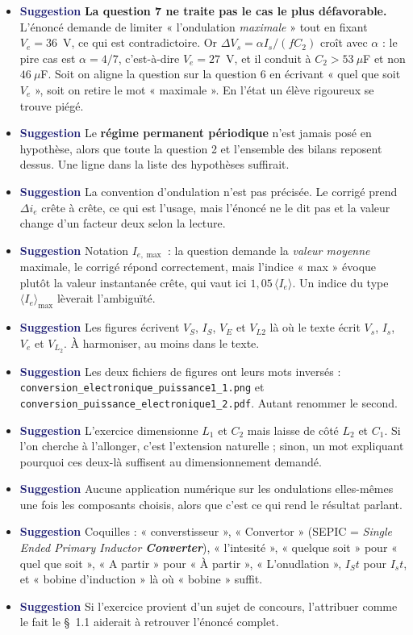 \documentclass[a4paper,11pt]{article}
\newcommand{\suggestion}{\textcolor{MidnightBlue}{\textbf{Suggestion}}}
\begin{document}
\begin{itemize}
	\item \suggestion{} \textbf{La question 7 ne traite pas le cas le plus défavorable.} L'énoncé
	demande de limiter « l'ondulation \textit{maximale} » tout en fixant $V_e=36$~V, ce qui est
	contradictoire. Or $\Delta V_s=\alpha I_s/(fC_2)$ croît avec $\alpha$ : le pire cas est
	$\alpha=4/7$, c'est-à-dire $V_e=27$~V, et il conduit à $C_2>53~\mu$F et non $46~\mu$F. Soit on
	aligne la question sur la question 6 en écrivant « quel que soit $V_e$ », soit on retire le mot
	« maximale ». En l'état un élève rigoureux se trouve piégé.
	\item \suggestion{} Le \textbf{régime permanent périodique} n'est jamais posé en hypothèse, alors
	que toute la question 2 et l'ensemble des bilans reposent dessus. Une ligne dans la liste des
	hypothèses suffirait.
	\item \suggestion{} La convention d'ondulation n'est pas précisée. Le corrigé prend $\Delta i_e$
	crête à crête, ce qui est l'usage, mais l'énoncé ne le dit pas et la valeur change d'un facteur
	deux selon la lecture.
	\item \suggestion{} Notation $I_{e,\max}$ : la question demande la \textit{valeur moyenne} maximale,
	le corrigé répond correctement, mais l'indice « max » évoque plutôt la valeur instantanée crête,
	qui vaut ici $1{,}05\,\langle I_e\rangle$. Un indice du type $\langle I_e\rangle_{\max}$ lèverait
	l'ambiguïté.
	\item \suggestion{} Les figures écrivent $V_S$, $I_S$, $V_E$ et $V_{L2}$ là où le texte écrit
	$V_s$, $I_s$, $V_e$ et $V_{L_2}$. À harmoniser, au moins dans le texte.
	\item \suggestion{} Les deux fichiers de figures ont leurs mots inversés :
	\texttt{conversion\_electronique\_puissance1\_1.png} et
	\texttt{conversion\_puissance\_electronique1\_2.pdf}. Autant renommer le second.
	\item \suggestion{} L'exercice dimensionne $L_1$ et $C_2$ mais laisse de côté $L_2$ et $C_1$. Si
	l'on cherche à l'allonger, c'est l'extension naturelle ; sinon, un mot expliquant pourquoi ces
	deux-là suffisent au dimensionnement demandé.
	\item \suggestion{} Aucune application numérique sur les ondulations elles-mêmes une fois les
	composants choisis, alors que c'est ce qui rend le résultat parlant.
	\item \suggestion{} Coquilles : « converstisseur », « Convertor » (SEPIC = \textit{Single Ended
	Primary Inductor \textbf{Converter}}), « l'intesité », « quelque soit » pour « quel que soit »,
	« A partir » pour « À partir », « L'onudlation », $I_St$ pour $I_st$, et « bobine d'induction »
	là où « bobine » suffit.
	\item \suggestion{} Si l'exercice provient d'un sujet de concours, l'attribuer comme le fait le
	\S~1.1 aiderait à retrouver l'énoncé complet.
\end{itemize}
\end{document}
